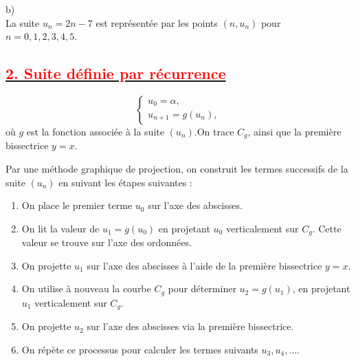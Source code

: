 \documentclass{article}
\begin{document}
b)\\
La suite \( u_n = 2n - 7 \) est représentée par les points \( (n, u_n) \) pour \( n = 0, 1, 2, 3, 4, 5 \).


\subsection*{\underline{\textbf{\textcolor{red}{2. Suite définie par récurrence}}}} 

\[
\begin{cases}
u_0 = \alpha, \\
u_{n+1} = g(u_n),
\end{cases}
\]
où \( g \) est la fonction associée à la suite \((u_n)\).On trace \( C_g \), ainsi que la première bissectrice \( y = x \).  

Par une méthode graphique de projection, on construit les termes successifs de la suite \((u_n)\) en suivant les étapes suivantes :  

\begin{enumerate}
    \item On place le premier terme \( u_0 \) sur l’axe des abscisses.  
    \item On lit la valeur de \( u_1 = g(u_0) \) en projetant \( u_0 \) verticalement sur \( C_g \). Cette valeur se trouve sur l’axe des ordonnées.  
    \item On projette \( u_1 \) sur l’axe des abscisses à l’aide de la première bissectrice \( y = x \).  
    \item On utilise à nouveau la courbe \( C_g \) pour déterminer \( u_2 = g(u_1) \), en projetant \( u_1 \) verticalement sur \( C_g \).  
    \item On projette \( u_2 \) sur l’axe des abscisses via la première bissectrice.  
    \item On répète ce processus pour calculer les termes suivants \( u_3, u_4, \dots \).  
\end{enumerate}
\end{document}
